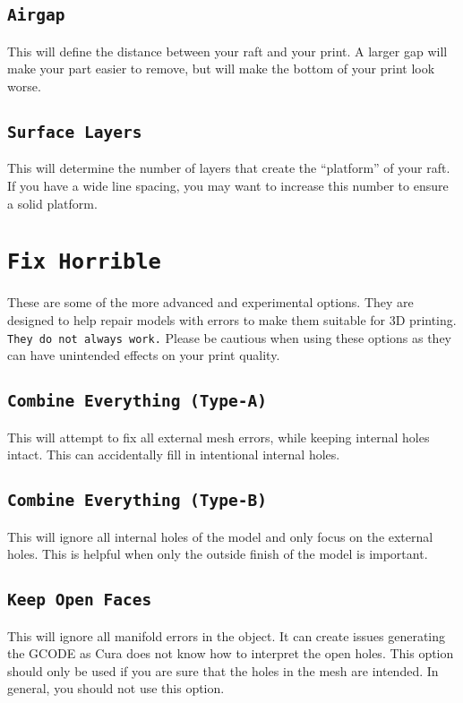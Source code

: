 \subsection{\texttt{Airgap}}
This will define the distance between your raft and your print. A larger gap will make your part easier to remove, but will make the bottom of your print look worse.

\subsection{\texttt{Surface Layers}}
This will determine the number of layers that create the “platform” of your raft. If you have a wide line spacing, you may want to increase this number to ensure a solid platform. 

\section{\texttt{Fix Horrible}}
These are some of the more advanced and experimental options. They are designed to help repair models with errors to make them suitable for 3D printing. \texttt{They do not always work.} Please be cautious when using these options as they can have unintended effects on your print quality.

\subsection{\texttt{Combine Everything (Type-A)}}
This will attempt to fix all external mesh errors, while keeping internal holes intact. This can accidentally fill in intentional internal holes.

\subsection{\texttt{Combine Everything (Type-B)}}
This will ignore all internal holes of the model and only focus on the external holes. This is helpful when only the outside finish of the model is important.

\subsection{\texttt{Keep Open Faces}}
This will ignore all manifold errors in the object. It can create issues generating the GCODE as Cura does not know how to interpret the open holes. This option should only be used if you are sure that the holes in the mesh are intended. In general, you should not use this option.


